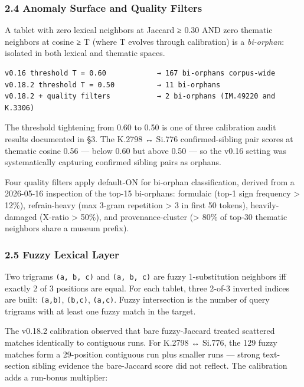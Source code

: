 \documentclass[
  11pt,
  letterpaper,
]{article}
\begin{document}
\subsubsection{2.4 Anomaly Surface and Quality
Filters}\label{anomaly-surface-and-quality-filters}

A tablet with zero lexical neighbors at Jaccard ≥ 0.30 AND zero thematic
neighbors at cosine ≥ T (where T evolves through calibration) is a
\emph{bi-orphan}: isolated in both lexical and thematic spaces.

\begin{verbatim}
v0.16 threshold T = 0.60            → 167 bi-orphans corpus-wide
v0.18.2 threshold T = 0.50          → 11 bi-orphans
v0.18.2 + quality filters           → 2 bi-orphans (IM.49220 and K.3306)
\end{verbatim}

The threshold tightening from 0.60 to 0.50 is one of three calibration
audit results documented in §3. The K.2798 ↔ Si.776 confirmed-sibling
pair scores at thematic cosine 0.56 --- below 0.60 but above 0.50 --- so
the v0.16 setting was systematically capturing confirmed sibling pairs
as orphans.

Four quality filters apply default-ON for bi-orphan classification,
derived from a 2026-05-16 inspection of the top-15 bi-orphans: formulaic
(top-1 sign frequency \textgreater{} 12\%), refrain-heavy (max 3-gram
repetition \textgreater{} 3 in first 50 tokens), heavily-damaged
(X-ratio \textgreater{} 50\%), and provenance-cluster (\textgreater{}
80\% of top-30 thematic neighbors share a museum prefix).

\subsubsection{2.5 Fuzzy Lexical Layer}\label{fuzzy-lexical-layer}

Two trigrams \texttt{(a,\ b,\ c)} and
\texttt{(a\textquotesingle{},\ b\textquotesingle{},\ c\textquotesingle{})}
are fuzzy 1-substitution neighbors iff exactly 2 of 3 positions are
equal. For each tablet, three 2-of-3 inverted indices are built:
\texttt{(a,b)}, \texttt{(b,c)}, \texttt{(a,c)}. Fuzzy intersection is
the number of query trigrams with at least one fuzzy match in the
target.

The v0.18.2 calibration observed that bare fuzzy-Jaccard treated
scattered matches identically to contiguous runs. For K.2798 ↔ Si.776,
the 129 fuzzy matches form a 29-position contiguous run plus smaller
runs --- strong text-section sibling evidence the bare-Jaccard score did
not reflect. The calibration adds a run-bonus multiplier:
\end{document}
